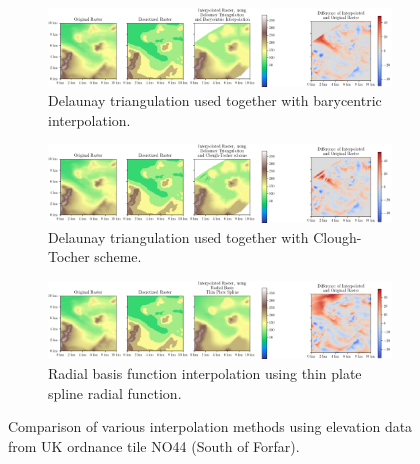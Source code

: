 \documentclass[a4paper,10pt]{report}
\begin{document}

\begin{figure}[H]
    \centering
    \begin{subfigure}{\textwidth}
        \includegraphics[width=1\textwidth]{../images/differences/Delaunay_Triangulation_and_Barycentric_Interpolation_2D.png}
    \caption{Delaunay triangulation used together with barycentric interpolation.}
    \end{subfigure}
    \begin{subfigure}{\textwidth}
        \includegraphics[width=1\textwidth]{../images/differences/Delaunay_Triangulation_and_Clough-Tocher_scheme_2D.png}
    \caption{Delaunay triangulation used together with Clough-Tocher scheme.}
    \end{subfigure}
    \begin{subfigure}{\textwidth}
        \includegraphics[width=1\textwidth]{../images/differences/Radial_Basis_Thin_Plate_Spline_2D.png}
    \caption{Radial basis function interpolation using thin plate spline radial function.}
    \end{subfigure}
    \caption{Comparison of various interpolation methods using elevation data from UK ordnance tile NO44 (South of Forfar).}
    \label{fig:2D_discretized_comparison}
\end{figure}
\end{document}
